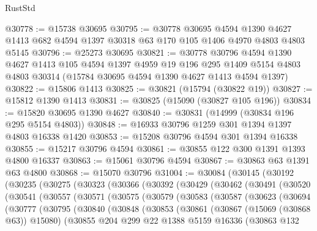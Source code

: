 \begin{lexlean}{RustStd}
\begin{coremodule}
@30778 := @15738 @30695
@30795 := @30778
    @30695
    @4594
    @1390
    @4627
    @1413
    @682
    @4594
    @1397
    @30318
    @63
    @170
    @105
    @1406
    @4970
    @4803
    @4803
    @5145
@30796 := @25273 @30695
@30821 := @30778
    @30796
    @4594
    @1390
    @4627
    @1413
    @105
    @4594
    @1397
    @4959
    @19
    @196
    @295
    @1409
    @5154
    @4803
    @4803
    @30314
    (@15784 @30695 @4594 @1390 @4627 @1413 @4594 @1397)
@30822 := @15806 @1413
@30825 := @30821 (@15794 (@30822 @19))
@30827 := @15812 @1390 @1413
@30831 := @30825 (@15090 (@30827 @105 @196))
@30834 := @15820 @30695 @1390 @4627
@30840 := @30831 (@14999 (@30834 @196 @295 @5154 @4803))
@30848 := @16933 @30796 @1259 @301 @1394 @1397 @4803 @16338 @1420
@30853 := @15208 @30796 @4594 @301 @1394 @16338
@30855 := @15217 @30796 @4594
@30861 := @30855 @122 @300 @1391 @1393 @4800 @16337
@30863 := @15061 @30796 @4594
@30867 := @30863 @63 @1391 @63 @4800
@30868 := @15070 @30796
@31004 := @30084
    (@30145
      (@30192
        (@30235
          (@30275
            (@30323
              (@30366
                (@30392
                  (@30429
                    (@30462
                      (@30491
                        (@30520
                          (@30541
                            (@30557
                              (@30571
                                (@30575
                                  (@30579
                                    (@30583
                                      (@30587
                                        (@30623
                                          (@30694
                                            (@30777
                                              (@30795
                                                (@30840
                                                  (@30848
                                                    (@30853
                                                      (@30861
                                                        (@30867 (@15069 (@30868 @63)) @15080)
                                                        (@30855
                                                          @204
                                                          @299
                                                          @22
                                                          @1388
                                                          @5159
                                                          @16336
                                                          (@30863
                                                            @132

\end{coremodule}
\end{lexlean}
